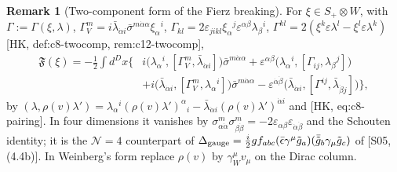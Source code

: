 \documentclass[11pt]{article}
\theoremstyle{definition}
\newtheorem{remark}[definition]{Remark}
\numberwithin{equation}{section}
\begin{document}
\begin{remark}[Two-component form of the Fierz breaking]
For $\xi\in S_+\otimes W$, with $\Gamma:=\Gamma(\xi,\lambda)$, $\Gamma^m_V=i\bar\lambda_{\dot\alpha i}\bar\sigma^{m\dot\alpha\alpha}\xi_\alpha{}^i$, $\Gamma_{kl}=2\varepsilon_{jikl}\xi_\alpha{}^j\varepsilon^{\alpha\beta}\lambda_\beta{}^i$, $\Gamma^{kl}=2(\xi^k\varepsilon\lambda^l-\xi^l\varepsilon\lambda^k)$ [HK, def:c8-twocomp, rem:c12-twocomp],
\[
\begin{aligned}
\mathfrak F(\xi)=-\tfrac12\int d^Dx\Big\{&i\big(\lambda_\alpha{}^i,[\Gamma^m_V,\bar\lambda_{\dot\alpha i}]\big)\bar\sigma^{m\dot\alpha\alpha}+\varepsilon^{\alpha\beta}\big(\lambda_\alpha{}^i,[\Gamma_{ij},\lambda_\beta{}^j]\big)\\
&+i\big(\bar\lambda_{\dot\alpha i},[\Gamma^m_V,\lambda_\alpha{}^i]\big)\bar\sigma^{m\dot\alpha\alpha}-\varepsilon^{\dot\alpha\dot\beta}\big(\bar\lambda_{\dot\alpha i},[\Gamma^{ij},\bar\lambda_{\dot\beta j}]\big)\Big\},
\end{aligned}
\]
by $(\lambda,\rho(v)\lambda')=\lambda_\alpha{}^i(\rho(v)\lambda')^\alpha{}_i-\bar\lambda_{\dot\alpha i}(\rho(v)\lambda')^{\dot\alpha i}$ and [HK, eq:c8-pairing]. In four dimensions it vanishes by $\sigma^m_{\alpha\dot\alpha}\sigma^m_{\beta\dot\beta}=-2\varepsilon_{\alpha\beta}\varepsilon_{\dot\alpha\dot\beta}$ and the Schouten identity; it is the $\mathcal N=4$ counterpart of $\Delta_{\rm gauge}=\frac i2gf_{abc}(\bar\epsilon\gamma^\mu\tilde g_a)(\bar{\tilde g}_b\gamma_\mu\tilde g_c)$ of [S05, (4.4b)]. In Weinberg's form replace $\rho(v)$ by $\gamma_W^\mu v_\mu$ on the Dirac column.
\end{remark}
\end{document}
